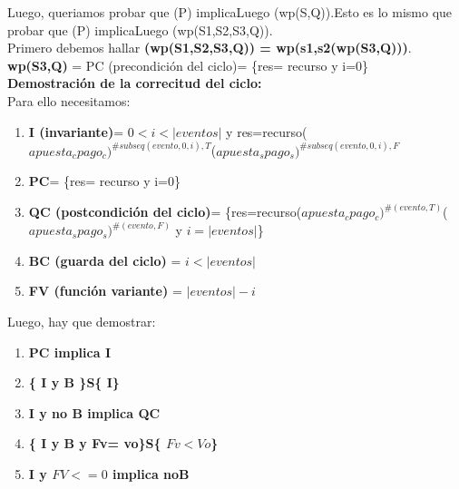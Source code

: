\documentclass[10pt,a4paper]{article}
\begin{document}
\begin{flushleft}
\vspace{3mm}
Luego, queriamos probar que (P) implicaLuego (wp(S,Q)).Esto es lo mismo que probar que (P) implicaLuego (wp(S1,S2,S3,Q)).\\
\vspace{3mm}
Primero debemos hallar \textbf{(wp(S1,S2,S3,Q)) = wp(s1,s2(wp(S3,Q)))}.\\
\vspace{3mm}
\textbf{wp(S3,Q)} = PC (precondición del ciclo)= \{res= recurso y i=0\}\\
\vspace{3mm}
\textbf{Demostración de la correcitud del ciclo:}\\
\vspace{3mm}
Para ello necesitamos: 
\begin{enumerate} \setlength\itemsep{0cm}
	\item \textbf{I (invariante)}= $0<i<|eventos|$ y res=recurso($apuesta_cpago_c)^{\#subseq(evento,0,i),T}$($apuesta_spago_s)^{\#subseq(evento,0,i),F}$
	\item \textbf{PC}= \{res= recurso y i=0\}
	\item \textbf{QC (postcondición del ciclo)}= \{res=recurso($apuesta_cpago_c)^{\#(evento,T)}$($apuesta_spago_s)^{\#(evento,F)}$ y $i=|eventos|$\}
	\item \textbf{BC (guarda del ciclo)} = $i < |eventos|$
	\item \textbf{FV (función variante)} = $|eventos|-i$
\end{enumerate}

Luego, hay que demostrar:
\begin{enumerate} \setlength\itemsep{0cm}
	\item \textbf{PC implica I}
	\item \textbf{\{ I y B \}S\{ I\}}
	\item \textbf{I y no B implica QC}
	\item \textbf{\{ I y B  y Fv= vo\}S\{ $Fv<Vo$\}}
	\item \textbf{I y $FV<=0$ implica noB}
\end{enumerate}


\end{flushleft}
\end{document}
